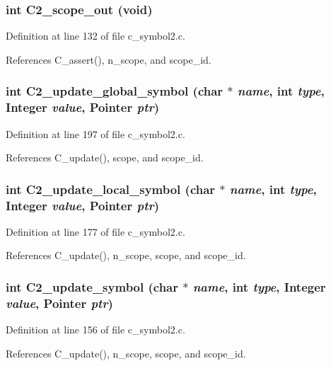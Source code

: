 \subsubsection{\setlength{\rightskip}{0pt plus 5cm}int C2\_\-scope\_\-out (void)}\label{c__symbol2_8h_6cbd045e663b5f63f8b6f1d85c62be29}




Definition at line 132 of file c\_\-symbol2.c.

References C\_\-assert(), n\_\-scope, and scope\_\-id.
\subsubsection{\setlength{\rightskip}{0pt plus 5cm}int C2\_\-update\_\-global\_\-symbol (char $\ast$ {\em name}, int {\em type}, \bf{Integer} {\em value}, \bf{Pointer} {\em ptr})}\label{c__symbol2_8h_04bb4acda6b91a41201e83899a8c226a}




Definition at line 197 of file c\_\-symbol2.c.

References C\_\-update(), scope, and scope\_\-id.
\subsubsection{\setlength{\rightskip}{0pt plus 5cm}int C2\_\-update\_\-local\_\-symbol (char $\ast$ {\em name}, int {\em type}, \bf{Integer} {\em value}, \bf{Pointer} {\em ptr})}\label{c__symbol2_8h_92a8b119b6aa8a5ae4e2edb16b529345}




Definition at line 177 of file c\_\-symbol2.c.

References C\_\-update(), n\_\-scope, scope, and scope\_\-id.
\subsubsection{\setlength{\rightskip}{0pt plus 5cm}int C2\_\-update\_\-symbol (char $\ast$ {\em name}, int {\em type}, \bf{Integer} {\em value}, \bf{Pointer} {\em ptr})}\label{c__symbol2_8h_880d798e681989217dcd06cf2c6b1401}




Definition at line 156 of file c\_\-symbol2.c.

References C\_\-update(), n\_\-scope, scope, and scope\_\-id.